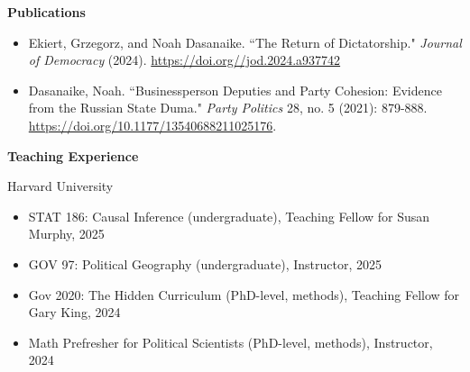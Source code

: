 \documentclass[12pt]{article}
\begin{document}
\begin{footnotesize}
\begin{itemize}
\end{itemize}

\vspace{5mm} 





{\bf {\normalsize Publications}}

\vspace{3mm} 

\begin{itemize}[noitemsep,nolistsep]

\item Ekiert, Grzegorz, and Noah Dasanaike. ``The Return of Dictatorship." \emph{Journal of Democracy} (2024). \href{https://noahdasanaike.github.io/research/dasanaike_ekiert_2024.pdf}{https://doi.org//\allowbreak jod.2024.\allowbreak a937742}

\item Dasanaike, Noah. ``Businessperson Deputies and Party Cohesion: Evidence from the Russian State Duma." \emph{Party Politics} 28, no. 5 (2021): 879-888. \href{https://noahdasanaike.github.io/research/dasanaike_2021_duma.pdf}{https://doi.org/10.1177/13540688211025176}.

\end{itemize}

\vspace{5mm} 




{\bf {\normalsize Teaching Experience}}

\vspace{3mm} 

Harvard University

\vspace{1.5mm} 

\begin{itemize}[noitemsep,nolistsep]

\item STAT 186: Causal Inference (undergraduate), Teaching Fellow for Susan Murphy, 2025

\item GOV 97: Political Geography (undergraduate), Instructor, 2025

\item Gov 2020: The Hidden Curriculum (PhD-level, methods), Teaching Fellow for Gary King, 2024

\item Math Prefresher for Political Scientists (PhD-level, methods), Instructor, 2024


\end{itemize}
\end{footnotesize}
\end{document}
